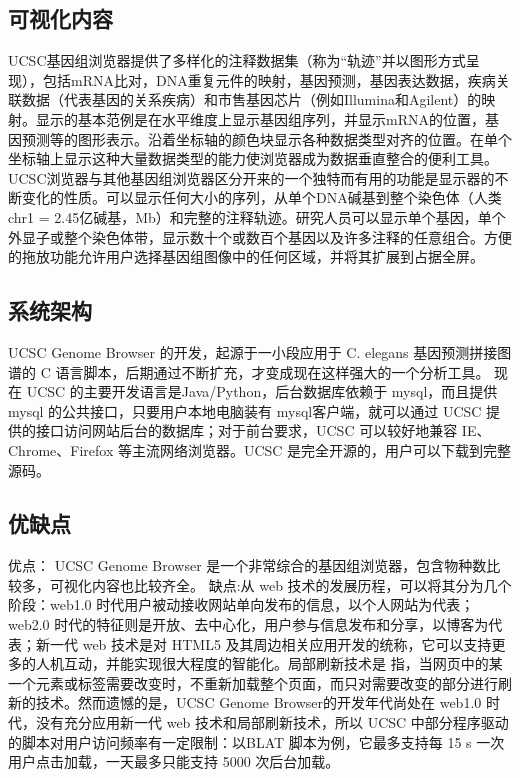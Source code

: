			\subsection{可视化内容}		
			UCSC基因组浏览器提供了多样化的注释数据集（称为“轨迹”并以图形方式呈现），包括mRNA比对，DNA重复元件的映射，基因预测，基因表达数据，疾病关联数据（代表基因的关系疾病）和市售基因芯片（例如Illumina和Agilent）的映射。显示的基本范例是在水平维度上显示基因组序列，并显示mRNA的位置，基因预测等的图形表示。沿着坐标轴的颜色块显示各种数据类型对齐的位置。在单个坐标轴上显示这种大量数据类型的能力使浏览器成为数据垂直整合的便利工具。\\
			\indent UCSC浏览器与其他基因组浏览器区分开来的一个独特而有用的功能是显示器的不断变化的性质。可以显示任何大小的序列，从单个DNA碱基到整个染色体（人类chr1 = 2.45亿碱基，Mb）和完整的注释轨迹。研究人员可以显示单个基因，单个外显子或整个染色体带，显示数十个或数百个基因以及许多注释的任意组合。方便的拖放功能允许用户选择基因组图像中的任何区域，并将其扩展到占据全屏。
			\subsection{系统架构}		
			UCSC Genome Browser 的开发，起源于一小段应用于 C. elegans 基因预测拼接图谱的 C 语言脚本，后期通过不断扩充，才变成现在这样强大的一个分析工具。 现在 UCSC 的主要开发语言是Java/Python，后台数据库依赖于 mysql，而且提供mysql 的公共接口，只要用户本地电脑装有 mysql客户端，就可以通过 UCSC 提供的接口访问网站后台的数据库；对于前台要求，UCSC 可以较好地兼容 IE、Chrome、Firefox 等主流网络浏览器。UCSC 是完全开源的，用户可以下载到完整源码。
			\subsection{优缺点}
			优点：	UCSC Genome Browser 是一个非常综合的基因组浏览器，包含物种数比较多，可视化内容也比较齐全。
			\indent 缺点:从 web 技术的发展历程，可以将其分为几个阶段：web1.0 时代用户被动接收网站单向发布的信息，以个人网站为代表；web2.0 时代的特征则是开放、去中心化，用户参与信息发布和分享，以博客为代表；新一代 web 技术是对 HTML5 及其周边相关应用开发的统称，它可以支持更多的人机互动，并能实现很大程度的智能化。局部刷新技术是
			指，当网页中的某一个元素或标签需要改变时，不重新加载整个页面，而只对需要改变的部分进行刷新的技术。然而遗憾的是，UCSC Genome Browser的开发年代尚处在 web1.0 时代，没有充分应用新一代 web 技术和局部刷新技术，所以 UCSC 中部分程序驱动的脚本对用户访问频率有一定限制：以BLAT 脚本为例，它最多支持每 15 s 一次用户点击加载，一天最多只能支持 5000 次后台加载。